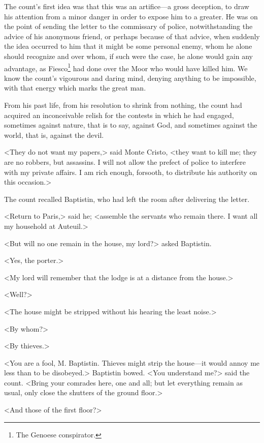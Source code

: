  The count's first idea was that this was an artifice—a gross deception, to draw his attention from a minor danger in order to expose him to a greater. He was on the point of sending the letter to the commissary of police, notwithstanding the advice of his anonymous friend, or perhaps because of that advice, when suddenly the idea occurred to him that it might be some personal enemy, whom he alone should recognize and over whom, if such were the case, he alone would gain any advantage, as Fiesco\footnote{The Genoese conspirator. } had done over the Moor who would have killed him. We know the count's vigourous and daring mind, denying anything to be impossible, with that energy which marks the great man. 

 From his past life, from his resolution to shrink from nothing, the count had acquired an inconceivable relish for the contests in which he had engaged, sometimes against nature, that is to say, against God, and sometimes against the world, that is, against the devil. 

 <They do not want my papers,> said Monte Cristo, <they want to kill me; they are no robbers, but assassins. I will not allow the prefect of police to interfere with my private affairs. I am rich enough, forsooth, to distribute his authority on this occasion.> 

 The count recalled Baptistin, who had left the room after delivering the letter. 

 <Return to Paris,> said he; <assemble the servants who remain there. I want all my household at Auteuil.> 

 <But will no one remain in the house, my lord?> asked Baptistin. 

 <Yes, the porter.> 

 <My lord will remember that the lodge is at a distance from the house.> 

 <Well?> 

 <The house might be stripped without his hearing the least noise.> 

 <By whom?> 

 <By thieves.> 

 <You are a fool, M. Baptistin. Thieves might strip the house—it would annoy me less than to be disobeyed.> Baptistin bowed.  <You understand me?> said the count. <Bring your comrades here, one and all; but let everything remain as usual, only close the shutters of the ground floor.> 

 <And those of the first floor?> 

